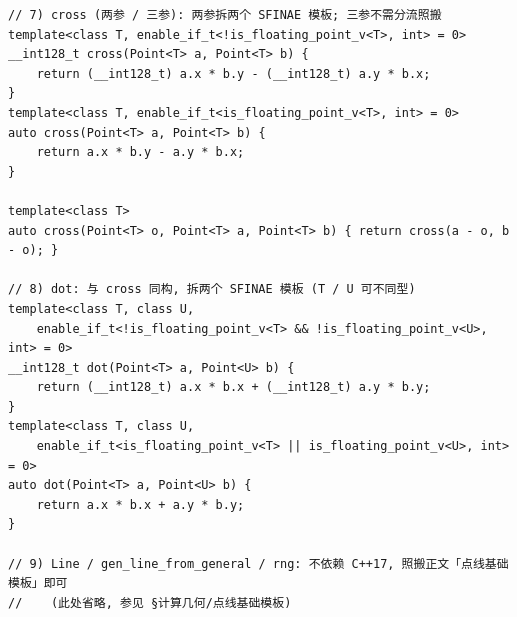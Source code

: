 \begin{verbatim}
// 7) cross (两参 / 三参): 两参拆两个 SFINAE 模板; 三参不需分流照搬
template<class T, enable_if_t<!is_floating_point_v<T>, int> = 0>
__int128_t cross(Point<T> a, Point<T> b) {
	return (__int128_t) a.x * b.y - (__int128_t) a.y * b.x;
}
template<class T, enable_if_t<is_floating_point_v<T>, int> = 0>
auto cross(Point<T> a, Point<T> b) {
	return a.x * b.y - a.y * b.x;
}

template<class T>
auto cross(Point<T> o, Point<T> a, Point<T> b) { return cross(a - o, b - o); }

// 8) dot: 与 cross 同构, 拆两个 SFINAE 模板 (T / U 可不同型)
template<class T, class U,
	enable_if_t<!is_floating_point_v<T> && !is_floating_point_v<U>, int> = 0>
__int128_t dot(Point<T> a, Point<U> b) {
	return (__int128_t) a.x * b.x + (__int128_t) a.y * b.y;
}
template<class T, class U,
	enable_if_t<is_floating_point_v<T> || is_floating_point_v<U>, int> = 0>
auto dot(Point<T> a, Point<U> b) {
	return a.x * b.x + a.y * b.y;
}

// 9) Line / gen_line_from_general / rng: 不依赖 C++17, 照搬正文「点线基础模板」即可
//    (此处省略, 参见 §计算几何/点线基础模板)
	\end{verbatim}

	\newpage
